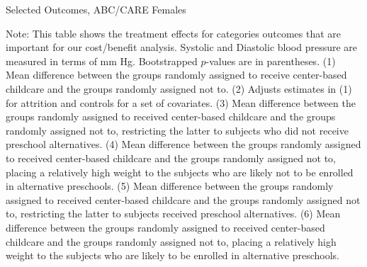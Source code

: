 \begin{table}[H]
\centering
\begin{threeparttable}
\caption{Selected Outcomes, ABC/CARE Females}\label{resultsfemales}
\begin{scriptsize}

\end{scriptsize}
\begin{tablenotes}
\footnotesize
\item Note: This table shows the treatment effects for categories outcomes that are important for our cost/benefit analysis. Systolic and Diastolic blood pressure are measured in terms of mm Hg. Bootstrapped $p$-values are in parentheses. (1) Mean difference between the groups randomly assigned to receive center-based childcare and the groups randomly assigned not to. (2) Adjusts estimates in (1) for attrition and controls for a set of covariates. (3) Mean difference between the groups randomly assigned to received center-based childcare and the groups randomly assigned not to, restricting the latter to subjects who did not receive preschool alternatives. (4) Mean difference between the groups randomly assigned to received center-based childcare and the groups randomly assigned not to, placing a relatively high weight to the subjects who are likely not to be enrolled in alternative preschools. (5) Mean difference between the groups randomly assigned to received center-based childcare and the groups randomly assigned not to, restricting the latter to subjects received preschool alternatives. (6) Mean difference between the groups randomly assigned to received center-based childcare and the groups randomly assigned not to, placing a relatively high weight to the subjects who are likely to be enrolled in alternative preschools.
\end{tablenotes}
\end{threeparttable}
\end{table}


